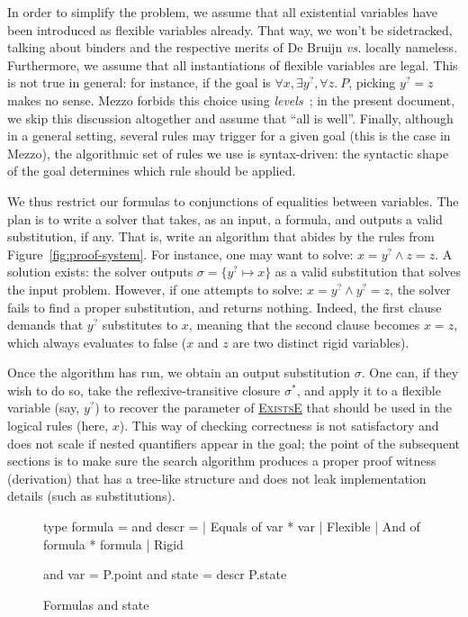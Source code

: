 \documentclass{easychair}
\let\TirName\textsc
\renewcommand{\DefTirName}[1]{\hyperlink{#1}{\TirName {#1}}}
\let\Rule\DefTirName
\newcommand{\fref}[1]{Figure~\ref{fig:#1}}
\newcommand{\f}[1]{\ensuremath{#1^?}} %
\begin{document}
In order to simplify the problem, we assume that all existential variables have
been introduced as flexible variables already. That way, we won't be
sidetracked, talking about binders and the respective merits of De Bruijn
\emph{vs.} locally nameless. Furthermore, we assume that all instantiations of
flexible variables are legal. This is not true in general: for instance, if the
goal is $\forall x, \exists \f y, \forall z.\ P$, picking $\f y = z$ makes no
sense. Mezzo forbids this choice using \emph{levels}~\cite{pottier-remy-emlti}; in the present document,
we skip this discussion altogether and assume that ``all is well''. Finally,
although in a general setting, several rules may trigger for a given goal (this
is the case in Mezzo), the algorithmic set of rules we use is syntax-driven: the
syntactic shape of the goal determines which rule should be applied.

We thus restrict our formulas to conjunctions of equalities between variables.
The plan is to write a solver that takes,
as an input, a formula, and outputs a valid substitution, if any. That is,
write an algorithm that abides by the rules from \fref{proof-system}.
For instance, one may want to solve: $x = \f y \wedge z = z$.
A solution exists: the solver outputs $\sigma = \{ \f y \mapsto x \}$ as a valid
substitution that solves the input problem. However, if one attempts to solve:
$x = \f y \wedge \f y = z$, the solver fails to find a
proper substitution, and returns nothing. Indeed, the first clause demands that
$\f y$ substitutes to $x$, meaning that the second clause becomes $x = z$, which
always evaluates to false ($x$ and $z$ are two distinct rigid variables).

Once the algorithm has run, we obtain an output substitution $\sigma$. One can, if they
wish to do so, take the reflexive-transitive closure $\sigma^*$, and apply it to
a flexible variable (say, $\f y$) to recover the parameter of \Rule{ExistsE}
that should be used in the logical rules (here, $x$). This way of checking
correctness is not satisfactory and does not scale if nested quantifiers appear
in the goal; the point of the subsequent sections is to make sure the search
algorithm produces a proper proof witness (derivation) that has a tree-like
structure and does not leak implementation details (such as substitutions).

\begin{figure}
  \centering
  \begin{ocaml}
type formula =                and descr =
| Equals of var * var           | Flexible
| And of formula * formula      | Rigid

and var = P.point             and state = descr P.state
  \end{ocaml}
  \caption{Formulas and state}
  \label{fig:formulas}
\end{figure}
\end{document}
